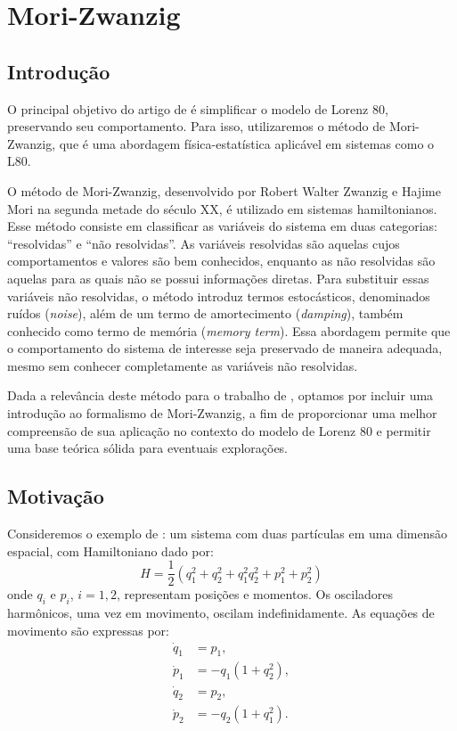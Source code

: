 \chapter{Mori-Zwanzig}

\section{Introdução}
O principal objetivo do artigo de \citet{Chekroun2021} é simplificar o modelo de Lorenz 80, preservando seu comportamento. Para isso, utilizaremos o método de Mori-Zwanzig, que é uma abordagem física-estatística aplicável em sistemas como o L80.

O método de Mori-Zwanzig, desenvolvido por Robert Walter Zwanzig e Hajime Mori na segunda metade do século XX, é utilizado em sistemas hamiltonianos. Esse método consiste em classificar as variáveis do sistema em duas categorias: ``resolvidas'' e ``não resolvidas''. As variáveis resolvidas são aquelas cujos comportamentos e valores são bem conhecidos, enquanto as não resolvidas são aquelas para as quais não se possui informações diretas. Para substituir essas variáveis não resolvidas, o método introduz termos estocásticos, denominados ruídos (\textit{noise}), além de um termo de amortecimento (\textit{damping}), também conhecido como termo de memória (\textit{memory term}). Essa abordagem permite que o comportamento do sistema de interesse seja preservado de maneira adequada, mesmo sem conhecer completamente as variáveis não resolvidas.

Dada a relevância deste método para o trabalho de \citet{Chekroun2021}, optamos por incluir uma introdução ao formalismo de Mori-Zwanzig, a fim de proporcionar uma melhor compreensão de sua aplicação no contexto do modelo de Lorenz 80 e permitir uma base teórica sólida para eventuais explorações.

\section{Motivação}
Consideremos o exemplo de \citet[p.173]{Chorin2013}: um sistema com duas partículas em uma dimensão espacial, com Hamiltoniano dado por:
\begin{equation*}
	H = \frac{1}{2}(q_1^2 + q_2^2 + q_1^2 q_2^2 + p_1^2 + p_2^2)
\end{equation*}
onde $q_i$ e $p_i$, $i = 1, 2$, representam posições e momentos. Os osciladores harmônicos, uma vez em movimento, oscilam indefinidamente. As equações de movimento são expressas por:
\begin{align}
	\dot{q}_1 & = p_1, \nonumber             \\
	\dot{p}_1 & = -q_1(1 + q_2^2), \nonumber \\
	\dot{q}_2 & = p_2, \nonumber             \\
	\dot{p}_2 & = -q_2(1 + q_1^2).           
	\label{eq:exemplo-sistema-harmonico}
\end{align}

